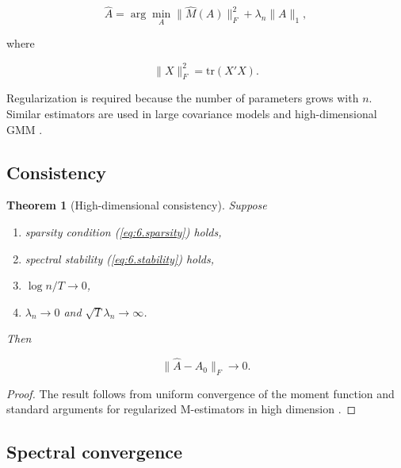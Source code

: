 \documentclass[12pt]{article}
\numberwithin{equation}{section}
\newtheorem{theorem}{Theorem}[section]
\begin{document}
\begin{equation}
\hat A
=
\arg\min_A
\|
\hat M(A)
\|_F^2
+
\lambda_n
\|A\|_1,
\label{eq:6.lasso}
\end{equation}

where

\begin{equation}
\|X\|_F^2
=
\mathrm{tr}(X'X).
\label{eq:6.frobenius}
\end{equation}

Regularization is required because the number of parameters grows with $n$.
Similar estimators are used in large covariance models and high-dimensional
GMM
\citep{fan2016overview}.

\subsection{Consistency}

\begin{theorem}[High-dimensional consistency]

Suppose

\begin{enumerate}

\item sparsity condition (\ref{eq:6.sparsity}) holds,

\item spectral stability (\ref{eq:6.stability}) holds,

\item $\log n / T \to 0$,

\item $\lambda_n \to 0$ and $\sqrt{T}\lambda_n \to \infty$.

\end{enumerate}

Then

\begin{equation}
\|
\hat A - A_0
\|_F
\to 0.
\label{eq:6.consistency}
\end{equation}

\end{theorem}

\begin{proof}

The result follows from uniform convergence of the moment function and
standard arguments for regularized M-estimators in high dimension
\citep{fan2016overview}.

\end{proof}

\subsection{Spectral convergence}
\end{document}
